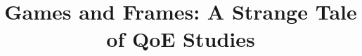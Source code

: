 \documentclass[conference,10pt,a4paper]{IEEEtran}
\begin{document}
\title{Games and Frames: A Strange Tale of QoE Studies}


\maketitle








\printbibliography 
\end{document}
